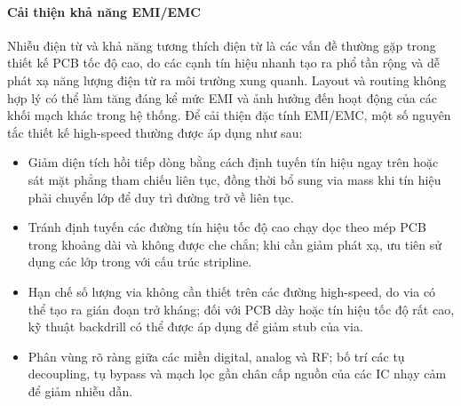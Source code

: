                     \paragraph{Cải thiện khả năng EMI/EMC}
                        Nhiễu điện từ và khả năng tương thích điện từ là các vấn đề thường gặp trong thiết kế PCB tốc độ cao, do các cạnh tín hiệu nhanh tạo ra phổ tần rộng và dễ phát xạ năng lượng điện từ ra môi trường xung quanh. Layout và routing không hợp lý có thể làm tăng đáng kể mức EMI và ảnh hưởng đến hoạt động của các khối mạch khác trong hệ thống. Để cải thiện đặc tính EMI/EMC, một số nguyên tắc thiết kế high-speed thường được áp dụng như sau:
                        \begin{itemize}
                            \item Giảm diện tích hồi tiếp dòng bằng cách định tuyến tín hiệu ngay trên hoặc sát mặt phẳng tham chiếu liên tục, đồng thời bổ sung via mass khi tín hiệu phải chuyển lớp để duy trì đường trở về liên tục.
                            \item Tránh định tuyến các đường tín hiệu tốc độ cao chạy dọc theo mép PCB trong khoảng dài và không được che chắn; khi cần giảm phát xạ, ưu tiên sử dụng các lớp trong với cấu trúc stripline.
                            \item Hạn chế số lượng via không cần thiết trên các đường high-speed, do via có thể tạo ra gián đoạn trở kháng; đối với PCB dày hoặc tín hiệu tốc độ rất cao, kỹ thuật backdrill có thể được áp dụng để giảm stub của via.
                            \item Phân vùng rõ ràng giữa các miền digital, analog và RF; bố trí các tụ decoupling, tụ bypass và mạch lọc gần chân cấp nguồn của các IC nhạy cảm để giảm nhiễu dẫn.
                        \end{itemize}
                    
